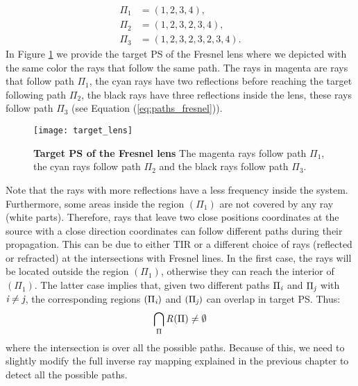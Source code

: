 \begin{equation}\label{eq:paths_fresnel}
\begin{aligned}
\Pi_1 & = (1,2,3,4),\\
\Pi_2 & = (1,2,3,2,3,4), \\
\Pi_3 & = (1,2,3,2,3,2,3,4).
\end{aligned}
\end{equation}
In Figure \ref{fig:target_PS_lens} we provide the target PS of the Fresnel lens where we depicted with the same color the rays that follow the same path. The rays in magenta are rays that follow path $\Pi_1$, the cyan rays have two reflections before reaching the target following path $\Pi_2$, the black rays have three reflections inside the lens, these rays follow path $\Pi_3$ (see Equation (\ref{eq:paths_fresnel})).
\begin{figure}[t]
  \begin{center}
  \texttt{[image: target\_lens]}
  \end{center}
  \caption{\textbf{Target PS of the Fresnel lens}
The magenta rays follow path $\Pi_1$, the cyan rays follow path $\Pi_2$ and the black rays follow path $\Pi_3$.}
\label{fig:target_PS_lens}
 \end{figure}
Note that the rays with more reflections have a less frequency inside the system. Furthermore, some areas inside the region $(\Pi_1)$ are not covered by any ray (white parts). Therefore, rays that leave two close positions coordinates at the source with a close direction coordinates can follow different paths during their propagation. This can be due to either TIR or a different choice of rays (reflected or refracted) at the intersections with Fresnel lines. In the first case, the rays will be located outside the region $(\Pi_1)$, otherwise they can reach the interior of $(\Pi_1)$. The latter case implies that, given two different paths $\Pi_{\textit{i}}$ and $\Pi_{\textit{j}}$ with $\textit{i}\neq\textit{j}$, the corresponding regions $(\Pi_{\textit{i}})$ and $(\Pi_{\textit{j}})$ can overlap in target PS. Thus:
\begin{equation}
\bigcap_{\Pi}\mbox{$\emph{R}_{\textit{}}$}(\Pi)\neq \emptyset
\end{equation}
where the intersection is over all the possible paths. 
Because of this, we need to slightly modify the full inverse ray mapping explained in the previous chapter to detect all the possible paths. \\ \indent
